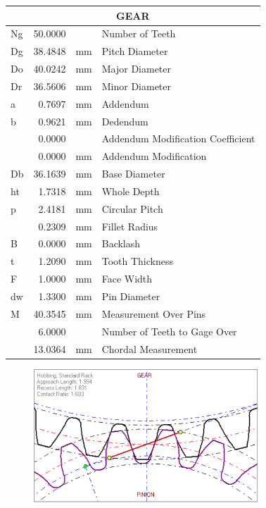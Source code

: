 \begin{appendices}
    \begin{center}
    \begin{tabular}{|l|r|l|l|}
    \hline
    \multicolumn{4}{|c|}{\textbf{GEAR}} \\ \hline
    Ng & 50.0000 &  & Number of Teeth \\ \hline
    Dg & 38.4848 & mm & Pitch Diameter \\ \hline
    Do & 40.0242 & mm & Major Diameter \\ \hline
    Dr & 36.5606 & mm & Minor Diameter \\ \hline
    a & 0.7697 & mm & Addendum \\ \hline
    b & 0.9621 & mm & Dedendum \\ \hline
     & 0.0000 &  & Addendum Modification Coefficient \\ \hline
     & 0.0000 & mm & Addendum Modification \\ \hline
    Db & 36.1639 & mm & Base Diameter \\ \hline
    ht & 1.7318 & mm & Whole Depth \\ \hline
    p & 2.4181 & mm & Circular Pitch \\ \hline
     & 0.2309 & mm & Fillet Radius \\ \hline
    B & 0.0000 & mm & Backlash \\ \hline
    t & 1.2090 & mm & Tooth Thickness \\ \hline
    F & 1.0000 & mm & Face Width \\ \hline
    dw & 1.3300 & mm &   Pin Diameter \\ \hline
    M & 40.3545 & mm &   Measurement Over Pins \\ \hline
     & 6.0000 &  &   Number of Teeth to Gage Over \\ \hline
     & 13.0364 & mm &   Chordal Measurement \\ \hline
    \end{tabular}
    \end{center}

    \begin{figure}[hb]
        \centering
        \includegraphics[width=0.75\textwidth]{figures/hip_gears.PNG}
    \end{figure}


\end{appendices}
